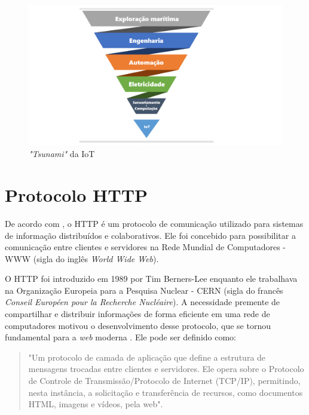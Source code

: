 \begin{figure}[!htb] \centering
  \caption{\textit{"Tsunami"} da IoT} \label{figura:evolucao_iot}
  \begin{varwidth}{\linewidth}
    \includegraphics[width=16cm]{figuras/Datta.png}
  \end{varwidth}
\end{figure}

\section{Protocolo HTTP}
De acordo com \textcite{RFC2616}, o HTTP é um protocolo de comunicação utilizado para sistemas de informação distribuídos e colaborativos. Ele foi concebido para possibilitar a comunicação entre clientes e servidores na Rede Mundial de Computadores - WWW (sigla do inglês \textit{World Wide Web}).

O HTTP foi introduzido em 1989 por Tim Berners-Lee enquanto ele trabalhava na Organização Europeia para a Pesquisa Nuclear - CERN (sigla do francês \textit{Conseil Européen pour la Recherche Nucléaire}). A necessidade premente de compartilhar e distribuir informações de forma eficiente em uma rede de computadores motivou o desenvolvimento desse protocolo, que se tornou fundamental para a \textit{web} moderna \parencite{Berners_web}. Ele pode ser definido como:

\begin{quote}
"Um protocolo de camada de aplicação que define a estrutura de mensagens trocadas entre clientes e servidores. Ele opera sobre o Protocolo de Controle de Transmissão/Protocolo de Internet (TCP/IP), permitindo, nesta instância, a solicitação e transferência de recursos, como documentos HTML, imagens e vídeos, pela web". \parencite[{p. 7}]{RFC2616}
\end{quote}

